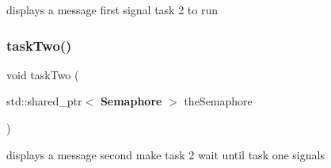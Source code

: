 displays a message first signal task 2 to run \mbox{\label{main_8cpp_ae4ea9570be601d182fa473c7ca431852}} 
\subsubsection{task\+Two()}
{\footnotesize\ttfamily void task\+Two (\begin{DoxyParamCaption}\item[{std\+::shared\+\_\+ptr$<$ \textbf{ Semaphore} $>$}]{the\+Semaphore }\end{DoxyParamCaption})}

displays a message second make task 2 wait until task one signals 